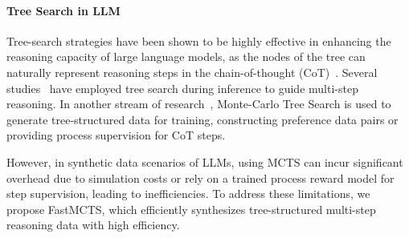 \paragraph{Tree Search in LLM}
Tree-search strategies have been shown to be highly effective in enhancing the reasoning capacity of large language models, as the nodes of the tree can naturally represent reasoning steps in the chain-of-thought (CoT)~\cite{wei2022chain}. Several studies~\cite{yao2024tree,hao2023reasoning,zhang2024accessing,tian2024toward} have employed tree search during inference to guide multi-step reasoning.
In another stream of research~\cite{feng2023alphazero,DBLP:journals/corr/abs-2405-03553,xie2024monte,zhang2024rest,wang2024towards}, Monte-Carlo Tree Search is used to generate tree-structured data for training, constructing preference data pairs or providing process supervision for CoT steps.

However, in synthetic data scenarios of LLMs, using MCTS can incur significant overhead due to simulation costs or rely on a trained process reward model for step supervision, leading to inefficiencies. To address these limitations, we propose FastMCTS, which efficiently synthesizes tree-structured multi-step reasoning data with high efficiency.

















